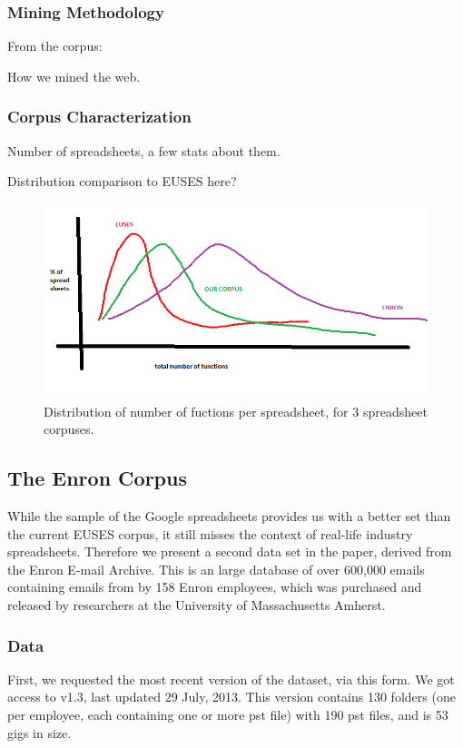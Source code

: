 \documentclass[conference]{IEEEtran}
\begin{document}
\subsubsection{Mining Methodology}

From the corpus: 


How we mined the web.

\subsubsection{Corpus Characterization}

Number of spreadsheets, a few stats about them.

Distribution comparison to EUSES here?


\begin{figure}[!t]
\centering
\includegraphics[width=\columnwidth]{functions.png}
\caption{Distribution of number of fuctions per spreadsheet, for 3 spreadsheet corpuses.}
\label{fig:functions}
\end{figure}

\subsection{The Enron Corpus}

While the sample of the Google spreadsheets provides us with a better set than the current EUSES corpus, it still misses the context of real-life industry spreadsheets. Therefore we present a second data set in the paper, derived from the Enron E-mail Archive. This is an large database of over 600,000 emails containing emails from by 158 Enron employees, which was purchased and released by researchers at the University of Massachusetts Amherst. 

\subsubsection{Data}
First, we requested the most recent version of the dataset, via this form. We got access to v1.3, last updated 29 July, 2013. This version contains 130 folders (one per employee, each containing one or more pst file) with 190 pst files, and is 53 gigs in size.
\end{document}
